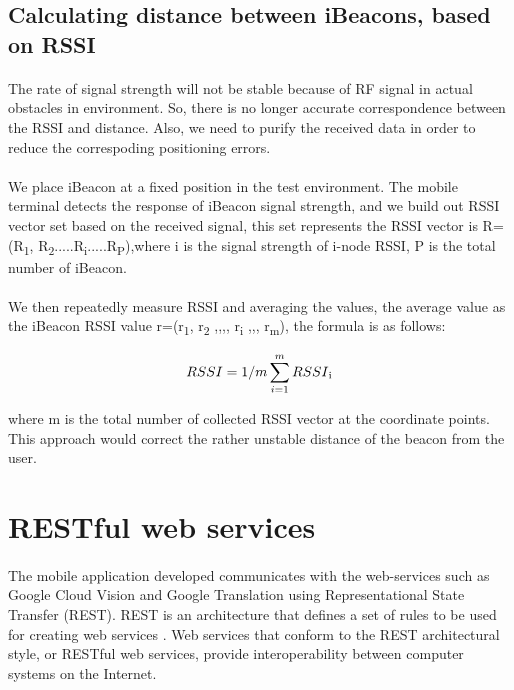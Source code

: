 \documentclass[12pt]{article}
\begin{document}
\subsection{Calculating distance between iBeacons, based on RSSI}
\paragraph{}The rate of signal strength will not be stable because of RF signal in actual obstacles in environment. So, there is no longer accurate correspondence between the RSSI and distance. Also, we need to purify the received data in order to reduce the correspoding positioning errors.

\paragraph{}We place iBeacon at a fixed position in the test environment. The mobile terminal detects the response of iBeacon signal strength, and we build out RSSI vector set based on the received signal, this set represents the RSSI vector is R=(R\textsubscript{1}, R\textsubscript{2}.....R\textsubscript{i}.....R\textsubscript{P}),where i is the signal strength of i-node RSSI, P is the total number of iBeacon. \cite{distanceTrack}

\paragraph{}We then repeatedly measure RSSI and averaging the values, the average value as the iBeacon RSSI value r=(r\textsubscript{1}, r\textsubscript{2} ,,,, r\textsubscript{i} ,,, r\textsubscript{m}), the formula is as follows:

\begin{equation}
RSSI = 1/m \sum_{i=1}^m RSSI \textsubscript{i}
\end{equation}

where m is the total number of collected RSSI vector at the coordinate points. This approach would correct the rather unstable distance of the beacon from the user. 


\section{RESTful web services}
\paragraph{} The mobile application developed communicates with the web-services such as Google Cloud Vision and Google Translation using Representational State Transfer (REST).  REST is an 
architecture that defines a set of rules to be used for creating web services \cite{rest}. Web services that conform to the REST architectural style, or RESTful web services, provide interoperability between computer systems on the Internet.
\end{document}
